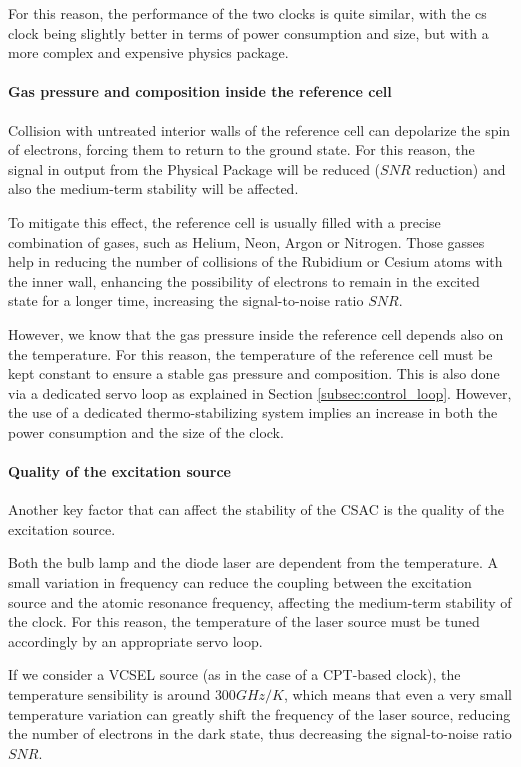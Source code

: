 For this reason, the performance of the two clocks is quite similar, with the \acrshort{cs} clock being slightly better in terms of power consumption and size, but with a more complex and expensive physics package.


\paragraph{Gas pressure and composition inside the reference cell}

Collision with untreated interior walls of the reference cell can depolarize the spin of electrons, forcing them to return to the ground state.
For this reason, the signal in output from the Physical Package will be reduced ($SNR$ reduction) and also the medium-term stability will be affected.

To mitigate this effect, the reference cell is usually filled with a precise combination of gases, such as Helium, Neon, Argon or Nitrogen.
Those gasses help in reducing the number of collisions of the Rubidium or Cesium atoms with the inner wall, enhancing the possibility of electrons to remain in the excited state for a longer time, increasing the signal-to-noise ratio $SNR$.

However, we know that the gas pressure inside the reference cell depends also on the temperature.
For this reason, the temperature of the reference cell must be kept constant to ensure a stable gas pressure and composition.
This is also done via a dedicated servo loop as explained in Section \ref{subsec:control_loop}.
However, the use of a dedicated thermo-stabilizing system implies an increase in both the power consumption and the size of the clock.


\paragraph{Quality of the excitation source}

Another key factor that can affect the stability of the CSAC is the quality of the excitation source.

Both the bulb lamp and the diode laser are dependent from the temperature.
A small variation in frequency can reduce the coupling between the excitation source and the atomic resonance frequency, affecting the medium-term stability of the clock.
For this reason, the temperature of the laser source must be tuned accordingly by an appropriate servo loop.

If we consider a VCSEL source (as in the case of a CPT-based clock), the temperature sensibility is around $300 GHz/K$, which means that even a very small temperature variation can greatly shift the frequency of the laser source, reducing the number of electrons in the dark state, thus decreasing the signal-to-noise ratio $SNR$.


